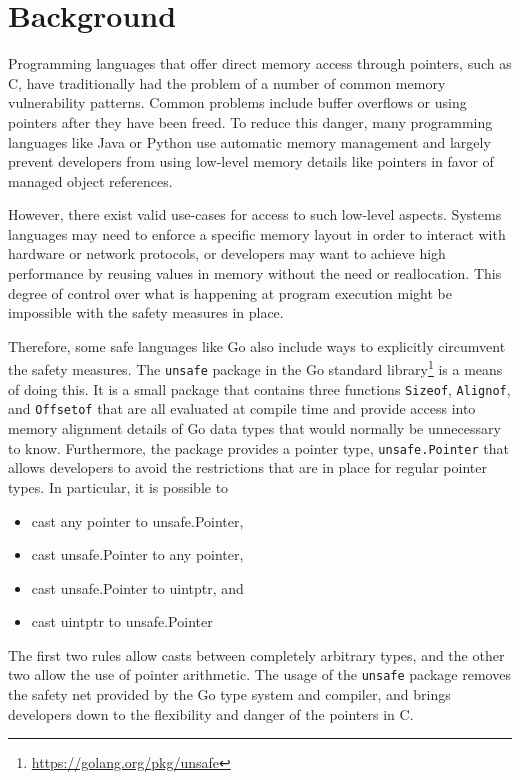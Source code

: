 \section{Background}
\label{sec:background}

Programming languages that offer direct memory access through pointers, such as C, have traditionally had the problem of a number of common memory vulnerability patterns.
Common problems include buffer overflows \cite{alnaeli2017, larochelle2001} or using pointers after they have been freed.
To reduce this danger, many programming languages like Java or Python use automatic memory management and largely prevent developers from using low-level memory details like pointers in favor of managed object references.

However, there exist valid use-cases for access to such low-level aspects.
Systems languages may need to enforce a specific memory layout in order to interact with hardware or network protocols, or developers may want to achieve high performance by reusing values in memory without the need or reallocation. This degree of control over what is happening at program execution might be impossible with the safety measures in place.

Therefore, some safe languages like Go also include ways to explicitly circumvent the safety measures. The \texttt{unsafe} package in the Go standard library\footnote{\url{https://golang.org/pkg/unsafe}} is a means of doing this. It is a small package that contains three functions \texttt{Sizeof}, \texttt{Alignof}, and \texttt{Offsetof} that are all evaluated at compile time and provide access into memory alignment details of Go data types that would normally be unnecessary to know.
Furthermore, the package provides a pointer type, \texttt{unsafe.Pointer} that allows developers to avoid the restrictions that are in place for regular pointer types.
In particular, it is possible to 

\begin{itemize}
    \item cast any pointer to unsafe.Pointer,
    \item cast unsafe.Pointer to any pointer,
    \item cast unsafe.Pointer to uintptr, and
    \item cast uintptr to unsafe.Pointer
\end{itemize}

The first two rules allow casts between completely arbitrary types, and the other two allow the use of pointer arithmetic.
The usage of the \texttt{unsafe} package removes the safety net provided by the Go type system and compiler, and brings developers down to the flexibility and danger of the pointers in C.

